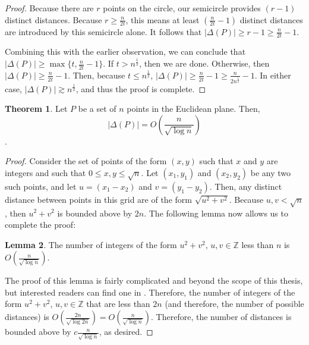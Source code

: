 \documentclass{scrippsthesisclass}
\theoremstyle{definition}
\newtheorem{theorem}{Theorem}[section]
\newtheorem{lemma}[theorem]{Lemma}
\begin{document}
\begin{proof}
    Because there are $r$ points on the circle, our semicircle provides $(r -1)$ distinct distances. 
    Because $r \geq \frac{n}{2t}$, this means at least $\left(\frac{n}{2t} - 1\right)$ distinct distances are introduced by this semicircle alone.
    It follows that $|\Delta(P)|  \geq r - 1 \geq \frac{n}{2t} - 1$.

    Combining this with the earlier observation, we can conclude that $|\Delta(P)| \geq \max \{t, \frac{n}{2t} - 1\}$. 
    If $t > n^{\frac{1}{2}}$, then we are done. 
    Otherwise, then $|\Delta(P)| \geq \frac{n}{2t} - 1$.
    Then, because $t \leq n^{\frac{1}{2}}$, $|\Delta(P)|  \geq \frac{n}{2t} - 1 \geq \frac{n}{2n^{\frac{1}{2}}} - 1$. 
    In either case, $|\Delta(P)| \gtrsim n^{\frac{1}{2}}$, and thus the proof is complete. 
\end{proof}

\begin{theorem}
    Let $P$ be a set of $n$ points in the Euclidean plane. Then,
    \[
    |\Delta(P)| = O\left(\frac{n}{\sqrt{\log n}}\right)
    \].
\end{theorem}
\begin{proof}
    Consider the set of points of the form $(x, y)$ such that $x$ and $y$ are integers and such that $0 \leq x, y \leq \sqrt{n}$.
    Let $(x_1, y_1)$ and $(x_2, y_2)$ be any two such points, and let $u = (x_1 - x_2)$ and $v = (y_1 - y_2)$. 
    Then, any distinct distance between points in this grid are of the form $\sqrt{u^2 + v^2}$. 
    Because $u, v < \sqrt{n}$, then $u^2 + v^2$ is bounded above by $2n$.
    The following lemma now allows us to complete the proof:
    \begin{lemma}
        The number of integers of the form $u^2 + v^2$, $u, v \in \mathbb{Z}$ less than $n$ is $O\left(\frac{n}{\sqrt{\log n}}\right)$. 
    \end{lemma}
    The proof of this lemma is fairly complicated and beyond the scope of this thesis, but interested readers can find one in \cite{NumberTheory}.
    Therefore, the number of integers of the form $u^2 + v^2$, $u, v \in \mathbb{Z}$ that are less than $2n$ (and therefore, the number of possible distances) is $O\left(\frac{2n}{\sqrt{\log 2n}}\right) = O\left(\frac{n}{\sqrt{\log n}}\right)$. 
    Therefore, the number of distances is bounded above by $c\frac{n}{\sqrt{\log n}}$, as desired. 
\end{proof}

\newpage
\end{document}
